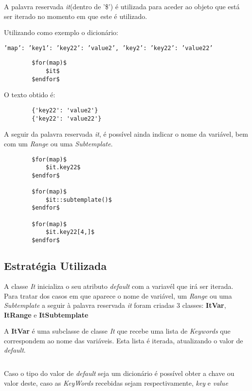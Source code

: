 \documentclass[../relatorio.tex]{subfiles}
\begin{document}
    A palavra reservada \textit{it}(dentro de '\$') é utilizada
    para aceder ao objeto que está ser iterado no momento em que
    este é utilizado.

    Utilizando como exemplo o dicionário:
    
    \texttt{'map': {'key1': {'key22': 'value2'}, 'key2': {'key22': 'value22'}}}

    \begin{verbatim}
        $for(map)$
            $it$
        $endfor$
    \end{verbatim}

    O texto obtido é:
    \begin{verbatim}
        {'key22': 'value2'}
        {'key22': 'value22'}
    \end{verbatim}

    A seguir da palavra reservada \textit{it}, é possível ainda indicar
    o nome da variável, bem com um \textit{Range} ou uma \textit{Subtemplate}.

    \begin{verbatim}
        $for(map)$
            $it.key22$
        $endfor$

        $for(map)$
            $it::subtemplate()$
        $endfor$

        $for(map)$
            $it.key22[4,]$
        $endfor$
    \end{verbatim}

    \subsection*{Estratégia Utilizada}

    A classe \textit{It} inicializa o seu atributo \textit{default}
    com a variavél que irá ser iterada. Para tratar dos casos em que
    aparece o nome de variável, um \textit{Range} ou uma \textit{Subtemplate}
    a seguir à palavra reservada \textit{it} foram criadas 3 classes: \textbf{ItVar}, 
    \textbf{ItRange} e \textbf{ItSubtemplate}


    A \textbf{ItVar} é uma subclasse de classe \textit{It} que recebe uma lista de \textit{Keywords}
    que correspondem ao nome das variáveis. Esta lista é iterada,
    atualizando o valor de \textit{default}. 
    
    \inputminted[firstline=11, lastline=17]{python}{../modules/It/ItVar.py}
    
    Caso o tipo do valor de \textit{default} seja um dicionário é possível obter
    a chave ou valor deste, caso as \textit{KeyWords} recebidas sejam respectivamente,
    \textit{key} e \textit{value}
\end{document}
